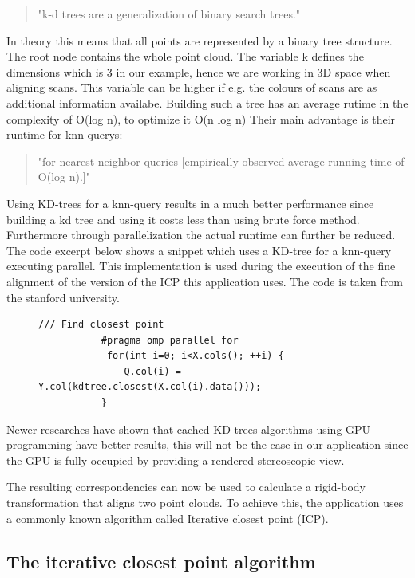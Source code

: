 \documentclass[hyperref,english,bachelorofscience,bibnum]{cgvpub}
\begin{document}
\begin{quote}
"k-d trees are a generalization of binary search trees."\cite{Nuchter2007}
\end{quote}
In theory this means that all points are represented by a binary tree structure. The root node contains the whole point cloud. The variable k defines the dimensions which is 3 in our example, hence we are working in 3D space when aligning scans. This variable can be higher if e.g. the colours of scans are as additional information availabe.
Building such a tree has an average rutime in the complexity of O(log n), to optimize it O(n log n)\cite{bentley1975}
Their main advantage is their runtime for knn-querys: 
\begin{quote}
"for nearest neighbor queries [empirically observed average running time of O(log n).]" \cite{bentley1975}
\end{quote}
Using KD-trees for a knn-query results in a much better performance since building a kd tree and using it costs less than using brute force method. Furthermore through parallelization the actual runtime can further be reduced. The code excerpt below shows a snippet which uses a KD-tree for a knn-query executing parallel. This implementation is used during the execution of the fine alignment of the version of the ICP this application uses. The code is taken from the stanford university.

\begin{figure}[htbp]
\begin{lstlisting}[frame=trbl]
           /// Find closest point
           #pragma omp parallel for
            for(int i=0; i<X.cols(); ++i) {
               Q.col(i) = Y.col(kdtree.closest(X.col(i).data()));
           }
\end{lstlisting}
\end{figure}

Newer researches have shown that cached KD-trees algorithms using GPU programming have better results\cite{Garcia2008}, this will not be the case in our application since the GPU is fully occupied by providing a rendered stereoscopic view.

The resulting correspondencies can now be used to calculate a rigid-body transformation that aligns two point clouds. To achieve this, the application uses a commonly known algorithm called Iterative closest point (ICP).

\subsection{The iterative closest point algorithm}
\end{document}
